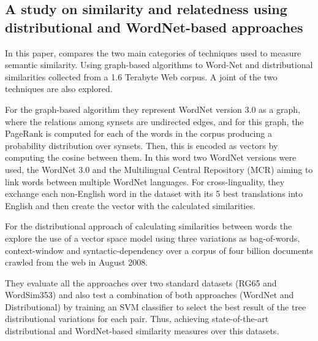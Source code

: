 \subsection{A study on similarity and relatedness using distributional and WordNet-based approaches}

In this paper,  compares the two main categories of techniques used to measure semantic similarity. Using graph-based algorithms to Word-Net and distributional similarities collected from a 1.6 Terabyte Web corpus. A joint of the two techniques are also explored.

For the graph-based algorithm they represent WordNet version 3.0 as a graph, where the relations among synsets are undirected edges, and for this graph, the PageRank is computed for each of the words in the corpus producing a probability distribution over synsets. Then, this is encoded as vectors by computing the cosine between them. In this word two WordNet versions were used, the WordNet 3.0 and the Multilingual Central Repository (MCR) aiming to link words between multiple WordNet languages. For cross-linguality, they exchange each non-English word in the dataset with its 5 best translations into English and then create the vector with the calculated similarities.

For the distributional approach of calculating similarities between words the explore the use of a vector space model using three variations as bag-of-words, context-window and syntactic-dependency over a corpus of four billion documents crawled from the web in August 2008.

They evaluate all the approaches over two standard datasets (RG65 and WordSim353) and also test a combination of both approaches (WordNet and Distributional) by training an SVM classifier to select the best result of the tree distributional variations for each pair. Thus, achieving state-of-the-art distributional and WordNet-based similarity measures over this datasets.